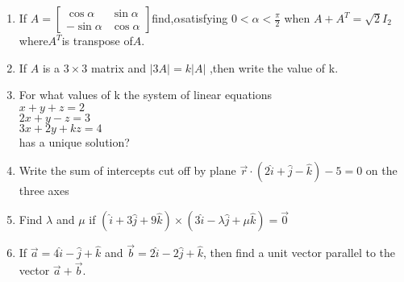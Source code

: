 \documentclass[a4paper 12pt]{article}
\begin{document}
\begin{enumerate}
\item If \( A = 
\begin{bmatrix}
\cos\alpha & \sin\alpha \\
-\sin\alpha & \cos\alpha
\end{bmatrix} \)find,\(\alpha\)satisfying
 \(0<\alpha<\frac{\pi}{2} \) when $A+A^T=\sqrt{2}I_2$  where\(A^T\)is transpose of\(A\). 
\item If \(A\) is a  \(3 \times 3\) matrix and \(\lvert 3A \rvert=k\)\(\lvert A \rvert\) ,then write the value of k.
\item For what values of k the system of linear equations \\  \(x+y+z=2\) \\ \(2x+y-z=3\) \\ \(3x+2y+kz=4\) \\ has a unique solution?
\item Write the sum of intercepts cut off by plane
$\vec{r} \cdot \left( 2\hat{i} + \hat{j} - \hat{k} \right) - 5 = 0$ on the three axes
\item Find  \(\lambda \) and \(\mu \) if $
\left( \hat{i} + 3\hat{j} + 9\hat{k} \right) \times \left( 3\hat{i} - \lambda \hat{j} + \mu \hat{k} \right) = \vec{0}
$
\item If \( \vec{a} = 4\hat{i} - \hat{j} + \hat{k} \) and \( \vec{b} = 2\hat{i} - 2\hat{j} + \hat{k} \), then find a unit vector parallel to the vector \( \vec{a} + \vec{b} \).
\end{enumerate}
\end{document}
